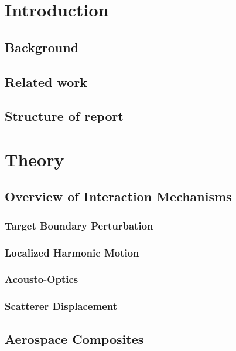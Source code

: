 \documentclass[10pt,a4paper]{eitExjobb}
\begin{document}
	\mainmatter		%
	
	\chapter{Introduction}
	
	\section{Background}
	
	\section{Related work}
	
	\section{Structure of report}
	
	\chapter{Theory}
	
	\section{Overview of Interaction Mechanisms}
	
	\subsection{Target Boundary Perturbation}
	
	\subsection{Localized Harmonic Motion}
	
	\subsection{Acousto-Optics}
	
	\subsection{Scatterer Displacement}
	
	\section{Aerospace Composites}
	
\end{document}
